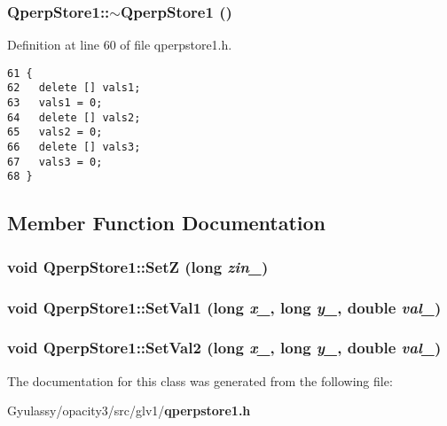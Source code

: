 \subsubsection{\setlength{\rightskip}{0pt plus 5cm}QperpStore1::$\sim$QperpStore1 ()}\label{classQperpStore1_1822e487987fc77bf927898616ed6de0}




Definition at line 60 of file qperpstore1.h.

\begin{Code}\begin{verbatim}61 {
62   delete [] vals1;
63   vals1 = 0;
64   delete [] vals2;
65   vals2 = 0;
66   delete [] vals3;
67   vals3 = 0;
68 }
\end{verbatim}
\end{Code}




\subsection{Member Function Documentation}
\subsubsection{\setlength{\rightskip}{0pt plus 5cm}void QperpStore1::SetZ (long {\em zin\_\-})\hspace{0.3cm}{\tt  [inline]}}\label{classQperpStore1_da5a646b78bc7b47e6a426edf6c21d6f}


\subsubsection{\setlength{\rightskip}{0pt plus 5cm}void QperpStore1::SetVal1 (long {\em x\_\-}, long {\em y\_\-}, double {\em val\_\-})}\label{classQperpStore1_aece9acc309b76ba553094be8c81ddcf}


\subsubsection{\setlength{\rightskip}{0pt plus 5cm}void QperpStore1::SetVal2 (long {\em x\_\-}, long {\em y\_\-}, double {\em val\_\-})}\label{classQperpStore1_928bb91ea205cb788f13e7da94e202ef}




The documentation for this class was generated from the following file:\begin{CompactItemize}
\item 
Gyulassy/opacity3/src/glv1/{\bf qperpstore1.h}\end{CompactItemize}
